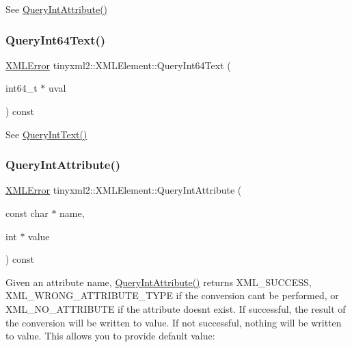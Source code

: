 See \mbox{\hyperlink{classtinyxml2_1_1_x_m_l_element_a8a78bc1187c1c45ad89f2690eab567b1}{Query\+Int\+Attribute()}} 

\mbox{\label{classtinyxml2_1_1_x_m_l_element_a120c538c8eead169e635dbc70fb226d8}} 
\subsubsection{\texorpdfstring{Query\+Int64\+Text()}{QueryInt64Text()}}
{\footnotesize\ttfamily \mbox{\hyperlink{namespacetinyxml2_a1fbf88509c3ac88c09117b1947414e08}{X\+M\+L\+Error}} tinyxml2\+::\+X\+M\+L\+Element\+::\+Query\+Int64\+Text (\begin{DoxyParamCaption}\item[{int64\+\_\+t $\ast$}]{uval }\end{DoxyParamCaption}) const}



See \mbox{\hyperlink{classtinyxml2_1_1_x_m_l_element_a926357996bef633cb736e1a558419632}{Query\+Int\+Text()}} 

\mbox{\label{classtinyxml2_1_1_x_m_l_element_a8a78bc1187c1c45ad89f2690eab567b1}} 
\subsubsection{\texorpdfstring{Query\+Int\+Attribute()}{QueryIntAttribute()}}
{\footnotesize\ttfamily \mbox{\hyperlink{namespacetinyxml2_a1fbf88509c3ac88c09117b1947414e08}{X\+M\+L\+Error}} tinyxml2\+::\+X\+M\+L\+Element\+::\+Query\+Int\+Attribute (\begin{DoxyParamCaption}\item[{const char $\ast$}]{name,  }\item[{int $\ast$}]{value }\end{DoxyParamCaption}) const\hspace{0.3cm}{\ttfamily [inline]}}

Given an attribute name, \mbox{\hyperlink{classtinyxml2_1_1_x_m_l_element_a8a78bc1187c1c45ad89f2690eab567b1}{Query\+Int\+Attribute()}} returns X\+M\+L\+\_\+\+S\+U\+C\+C\+E\+SS, X\+M\+L\+\_\+\+W\+R\+O\+N\+G\+\_\+\+A\+T\+T\+R\+I\+B\+U\+T\+E\+\_\+\+T\+Y\+PE if the conversion can\textquotesingle{}t be performed, or X\+M\+L\+\_\+\+N\+O\+\_\+\+A\+T\+T\+R\+I\+B\+U\+TE if the attribute doesn\textquotesingle{}t exist. If successful, the result of the conversion will be written to \textquotesingle{}value\textquotesingle{}. If not successful, nothing will be written to \textquotesingle{}value\textquotesingle{}. This allows you to provide default value\+:

